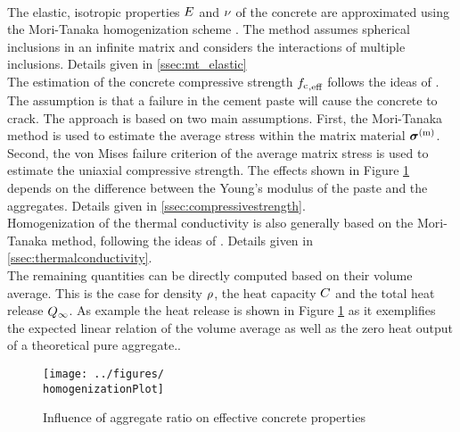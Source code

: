 \\
The elastic, isotropic properties $E$ and $\nu$ of the concrete are approximated using the Mori-Tanaka homogenization scheme \cite{mor_1973_asi}.
The method assumes spherical inclusions in an infinite matrix and considers the interactions of multiple inclusions. Details given in \ref{ssec:mt_elastic}\\
The estimation of the concrete compressive strength ${f_{\text{c}}}_{,\text{eff}}$ follows the ideas of \cite{nev_2018_mcam}.
The assumption is that a failure in the cement paste will cause the concrete to crack.
The approach is based on two main assumptions.
First, the Mori-Tanaka method is used to estimate the average stress within the matrix material $\boldsymbol{\sigma}^{(\text{m})}$. 
Second, the von Mises failure criterion of the average matrix stress is used to estimate the uniaxial compressive strength.
The effects shown in Figure \ref{fig:homogenization} depends on the difference between the Young's modulus of the paste and the aggregates. Details given in \ref{ssec:compressivestrength}.\\
Homogenization of the thermal conductivity is also generally based on the Mori-Tanaka method, following the ideas of \cite{str_2011_mbeo}. Details given in \ref{ssec:thermalconductivity}.\\
The remaining quantities can be directly computed based on their volume average.
This is the case for density $\rho$, the heat capacity $C$ and the total heat release $Q_{\infty}$.
As example the heat release is shown in Figure \ref{fig:homogenization} as it exemplifies the expected linear relation of the volume average as well as the zero heat output of a theoretical pure aggregate..
\begin{figure}[ht]%
	\centering
	\texttt{[image: ../figures/\\homogenizationPlot]}
	\caption{Influence of aggregate ratio on effective concrete properties}\label{fig:homogenization}
\end{figure}